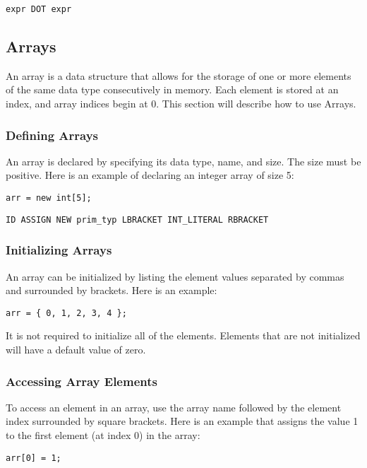 \documentclass{article}
\begin{document}
 
\begin{Verbatim}[frame=single]
expr DOT expr 
\end{Verbatim}


\subsection{Arrays}
An array is a data structure that allows for the storage of one or more elements of the same data type consecutively in memory. Each element is stored at an index, and array indices begin at 0. This section will describe how to use Arrays.

\subsubsection{Defining Arrays}
An array is declared by specifying its data type, name, and size. The size must be positive. Here is an example of declaring an integer array of size 5:

 \begin{lstlisting}
arr = new int[5];
\end{lstlisting}

\begin{Verbatim}[frame=single]
ID ASSIGN NEW prim_typ LBRACKET INT_LITERAL RBRACKET
\end{Verbatim}

\subsubsection{Initializing Arrays}
An array can be initialized by listing the element values separated by commas and surrounded by brackets. Here is an example:

 \begin{lstlisting}
arr = { 0, 1, 2, 3, 4 };
\end{lstlisting}

It is not required to initialize all of the elements. Elements that are not initialized will have a default value of zero.

\subsubsection{Accessing Array Elements}
To access an element in an array, use the array name followed by the element index surrounded by square brackets. Here is an example that assigns the value 1 to the first element (at index 0) in the array:

 \begin{lstlisting}
arr[0] = 1;
\end{lstlisting}
\end{document}

